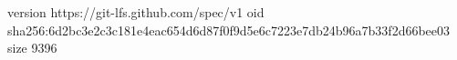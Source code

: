 version https://git-lfs.github.com/spec/v1
oid sha256:6d2bc3e2c3c181e4eac654d6d87f0f9d5e6c7223e7db24b96a7b33f2d66bee03
size 9396
